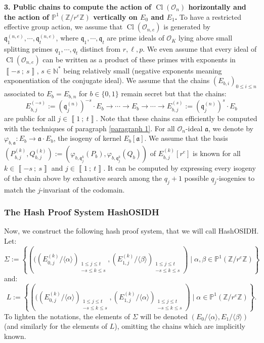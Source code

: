 \documentclass[a4paper,10pt]{report}
\theoremstyle{definition}
\theoremstyle{plain}
\theoremstyle{definition}
\newcommand{\N}{\mathbb{N}}
\newcommand{\Z}{\mathbb{Z}}
\newcommand{\mO}{\mathcal{O}}
\renewcommand{\i}[2]{\left\llbracket #1~;~#2\right\rrbracket}
\renewcommand{\(}{\left(}
\renewcommand{\)}{\right)}
\renewcommand{\P}{\mathbb{P}}
\newcommand{\mf}[1]{\mathfrak{#1}}
\DeclareMathOperator{\Cl}{Cl}
\begin{document}
\textbf{3. Public chains to compute the action of $\Cl(\mO_n)$ horizontally and the action of $\P^1(\Z/r^e\Z)$ vertically on $E_0$ and $E_1$.}
To have a restricted effective group action, we assume that $\Cl(\mO_{n,e})$ is generated by $\mf{q}_1^{(n,e)}, \cdots, \mf{q}_t^{(n,e)}$, where $\mf{q}_1, \cdots, \mf{q}_t$ are prime ideals of $\mO_K$ lying above small splitting primes $q_1, \cdots, q_t$ distinct from $r,\ell,p$. We even assume that every ideal of $\Cl(\mO_{n,e})$ can be written as a product of these primes with exponents in $\i{-s}{s}$, $s\in\N^*$ being relatively small (negative exponents meaning exponentiation of the conjugate ideal). We assume that the chains $(E_{b,i})_{0\leq i\leq n}$ associated to $E_b=E_{b,n}$ for $b\in\{0,1\}$ remain secret but that the chains:
\[E_{b,j}^{(-s)}:=(\mf{q}_j^{(n)})^{-s}\cdot E_b\longrightarrow \cdots \longrightarrow E_{b}\longrightarrow \cdots\longrightarrow E_{b,j}^{(s)}:=(\mf{q}_j^{(n)})^{s}\cdot E_b\]
are public for all $j\in\i{1}{t}$. Note that these chains can efficiently be computed with the techniques of paragraph \ref{paragraph 1}.  For all $\mO_n$-ideal $\mf{a}$, we denote by $\varphi_{b,\mf{a}}:E_b\longrightarrow \mf{a}\cdot E_b$, the isogeny of kernel $E_b[\mf{a}]$. We assume that the basis $(P_{b,j}^{(k)},Q_{b,j}^{(k)}):=(\varphi_{b,\mf{q}_j^{k}}(P_b),\varphi_{b,\mf{q}_j^{k}}(Q_b))$ of $E_{b,j}^{(k)}[r^e]$ is known for all $k\in\i{-s}{s}$ and $j\in\i{1}{t}$. It can be computed by expressing every isogeny of the chain above by exhaustive search among the $q_j+1$ possible $q_j$-isogenies to match the $j$-invariant of the codomain.

\subsubsection{The Hash Proof System HashOSIDH}

Now, we construct the following hash proof system, that we will call HashOSIDH. Let:
\[\Sigma:=\left\{\(((E_{0,j}^{(k)}/\langle\alpha\rangle)_{\substack{1\leq j\leq t\\ -s\leq k\leq s}}, (E_{1,j}^{(k)}/\langle\beta \rangle)_{\substack{1\leq j\leq t\\ -s\leq k\leq s}}\)\mid \alpha,\beta\in\P^1(\Z/r^e\Z)\right\}\]
and:
\[L:=\left\{\(((E_{0,j}^{(k)}/\langle\alpha\rangle)_{\substack{1\leq j\leq t\\ -s\leq k\leq s}}, (E_{1,j}^{(k)}/\langle\alpha \rangle)_{\substack{1\leq j\leq t\\ -s\leq k\leq s}}\)\mid \alpha\in\P^1(\Z/r^e\Z)\right\}.\]
To lighten the notations, the elements of $\Sigma$ will be denoted $(E_0/\langle\alpha\rangle, E_1/\langle\beta\rangle)$ (and similarly for the elements of $L$), omitting the chains which are implicitly known. 
\end{document}

